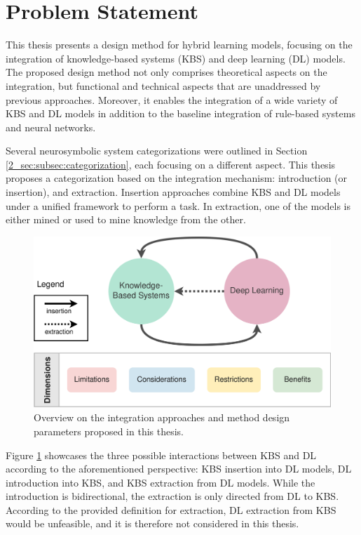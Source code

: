 \section{Problem Statement} \label{3_sec:problem_statement}
This thesis presents a design method for hybrid learning models, focusing on the integration of knowledge-based systems (KBS) and deep learning (DL) models. The proposed design method not only comprises theoretical aspects on the integration, but functional and technical aspects that are unaddressed by previous approaches.  Moreover, it enables the integration of a wide variety of KBS and DL models in addition to the baseline integration of rule-based systems and neural networks.  

Several neurosymbolic system categorizations were outlined in Section \ref{2_sec:subsec:categorization}, each focusing on a different aspect. This thesis proposes a categorization based on the integration mechanism: introduction (or insertion), and extraction. Insertion approaches combine KBS and DL models under a unified framework to perform a task. In extraction, one of the models is either mined or used to mine knowledge from the other. 

\begin{figure}[t]
    \centering
    \includegraphics[width=.9\linewidth]{3_objectives/figures/overview_method.eps}
    \caption{Overview on the integration approaches and method design parameters proposed in this thesis.}
    \label{fig:thesis_overview}
\end{figure}

Figure \ref{fig:thesis_overview} showcases the three possible interactions between KBS and DL according to the aforementioned perspective: KBS insertion into DL models, DL introduction into KBS, and KBS extraction from DL models. While the introduction is bidirectional, the extraction is only directed from DL to KBS. According to the provided definition for extraction, DL extraction from KBS would be unfeasible, and it is therefore not considered in this thesis. 

